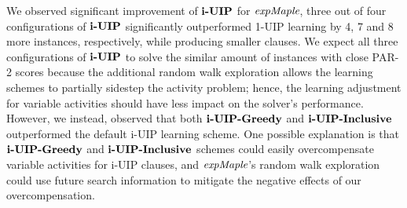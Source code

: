 We observed significant improvement of $\textbf{i-UIP}$ for $\textit{expMaple}$, three out of four configurations of $\textbf{i-UIP}$ significantly outperformed 1-UIP learning by 4, 7 and 8 more instances, respectively, while producing smaller clauses. We expect all three configurations of $\textbf{i-UIP}$ to solve the similar amount of instances with close PAR-2 scores because the additional random walk exploration allows the learning schemes to partially sidestep the activity problem; hence, the learning adjustment for variable activities should have less impact on the solver's performance. However, we instead, observed that both $\textbf{i-UIP-Greedy}$ and $\textbf{i-UIP-Inclusive}$ outperformed the default i-UIP learning scheme. One possible explanation is that $\textbf{i-UIP-Greedy}$ and $\textbf{i-UIP-Inclusive}$ schemes could easily overcompensate variable activities for i-UIP clauses, and $\textit{expMaple}$'s random walk exploration could use future search information to mitigate the negative effects of our overcompensation. 

